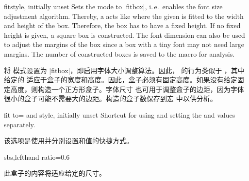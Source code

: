 \begin{docTcbKey}{fit}{}{style, initially unset}
Sets the  mode to |fitbox|, i.\,e.\ enables the
font size adjustment algorithm. Thereby, a  acts
like  where the given  is fitted to
the width and height of the box. Therefore, the box has to have a fixed height.
If no fixed height is given, a square box is constructed.
The font dimension  can also be used to adjust
the margins of the box since a box with a tiny font may not need large
margins. The number of constructed boxes is saved to the macro 
for analysis.

将  模式设置为 |fitbox|，即启用字体大小调整算法。因此， 的行为类似于 ，其中给定的  适应于盒子的宽度和高度。因此，盒子必须有固定高度。如果没有给定固定高度，则构造一个正方形盒子。字体尺寸  也可用于调整盒子的边距，因为字体很小的盒子可能不需要大的边距。构造的盒子数保存到宏  中以供分析。
\end{docTcbKey}


 
\begin{docTcbKey}{fit to}{= and }{style, initially unset}
Shortcut for using  and setting the  and  values
separately.

该选项是使用并分别设置和值的快捷方式。
\begin{dispExample*}{sbs,lefthand ratio=0.6}

\begin{tcolorbox}[fit to=3cm and 2cm]
此盒子的内容将适应给定的尺寸。
\end{tcolorbox}
\end{dispExample*}
\end{docTcbKey}


